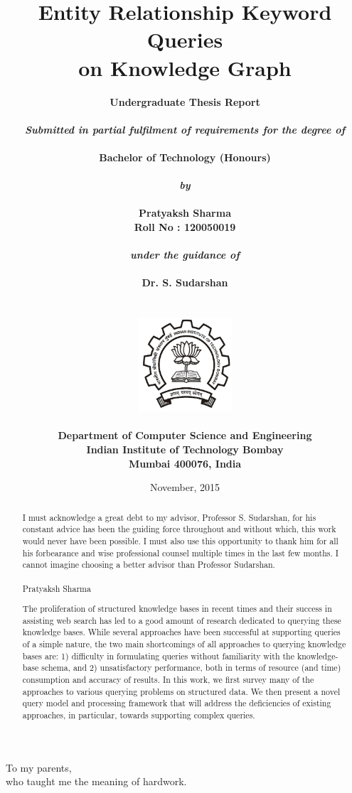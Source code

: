 \documentclass[a4paper, twoside, 12pt]{report}
\title{\textbf{Entity Relationship Keyword Queries \\ on Knowledge Graph}}
\author{
		\bf{Undergraduate Thesis Report}\\
        \\
        \emph{Submitted in partial fulfilment of requirements for the degree of}\\
        \\
        \bf{Bachelor of Technology (Honours)}\\
        \\
        \emph{by}\\
        \\
		\bf{Pratyaksh Sharma}\\
        \bf{Roll No : 120050019}\\
        \\
        \emph{under the guidance of}\\
        \\
		\bf{Dr. S. Sudarshan}\\
        \\\\
        \includegraphics[height=3.5cm]{iitb_logo.jpg}\\
        \\
		\bf{Department of Computer Science and Engineering}\\
        \bf{Indian Institute of Technology Bombay}\\
        \bf{Mumbai 400076, India}\\
}
\date{November, 2015}
\makeatletter
\newenvironment{dedication}
  {\clearpage           %
   \thispagestyle{empty}%
   \vspace*{\stretch{1}}%
   \itshape             %
   \center          %
  }
  {\par %
   \vspace{\stretch{3}} %
   \clearpage           %
}
\newcommand\frontmatter{%
    \cleardoublepage
  \pagenumbering{roman}}
\newcommand\mainmatter{%
    \cleardoublepage
  \pagenumbering{arabic}}
\makeatother
\begin{document}
\frontmatter

\maketitle

\linespread{1.2}

\setlength{\parindent}{2em}
\setlength{\parskip}{0.5em}


\begin{dedication}
To my parents,\\ who taught me the meaning of hardwork.
\end{dedication}


\renewcommand{\abstractname}{Acknowledgements}

\begin{abstract}
  I must acknowledge a great debt to my advisor, Professor S. Sudarshan, for his constant advice has been the guiding force throughout and without which, this work would never have been possible. I must also use this opportunity to thank him for all his forbearance and wise professional counsel multiple times in the last few months. I cannot imagine choosing a better advisor than Professor Sudarshan.
  \\ \\
Pratyaksh Sharma
\end{abstract}


\renewcommand{\abstractname}{Abstract}
\begin{abstract}
  The proliferation of structured knowledge bases in recent times and their success in assisting web search has led to a good amount of research dedicated to querying these knowledge bases. While several approaches have been successful at supporting queries of a simple nature, the two main shortcomings of all approaches to querying knowledge bases are: 1) difficulty in formulating queries without familiarity with the knowledge-base schema, and 2) unsatisfactory performance, both in terms of resource (and time) consumption and accuracy of results. In this work, we first survey many of the approaches to various querying problems on structured data. We then present a novel query model and processing framework that will address the deficiencies of existing approaches, in particular, towards supporting complex queries.

\end{abstract}


\tableofcontents

\mainmatter


\pagebreak














\end{document}
